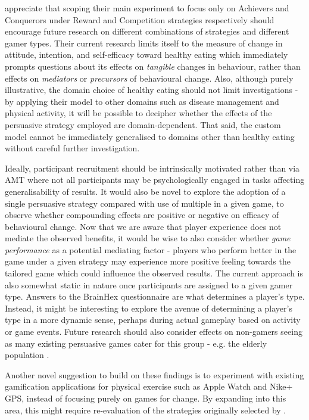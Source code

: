\documentclass[11pt]{article}
\begin{document}
\citeauthor{orji2017} appreciate that scoping their main experiment to focus only on Achievers and Conquerors under Reward and Competition strategies respectively should encourage future research on different combinations of strategies and different gamer types. Their current research limits itself to the measure of change in attitude, intention, and self-efficacy toward healthy eating which immediately prompts questions about its effects on \textit{tangible} changes in behaviour, rather than effects on \textit{mediators} or \textit{precursors} of behavioural change. Also, although purely illustrative, the domain choice of healthy eating should not limit investigations - by applying their model to other domains such as disease management and physical activity, it will be possible to decipher whether the effects of the persuasive strategy employed are domain-dependent. That said, the custom model cannot be immediately generalised to domains other than healthy eating without careful further investigation.

Ideally, participant recruitment should be intrinsically motivated rather than via AMT where not all participants may be psychologically engaged in tasks affecting generalisability of results. It would also be novel to explore the adoption of a single persuasive strategy compared with use of multiple in a given game, to observe whether compounding effects are positive or negative on efficacy of behavioural change. Now that we are aware that player experience does not mediate the observed benefits, it would be wise to also consider whether \textit{game performance} as a potential mediating factor - players who perform better in the game under a given strategy may experience more positive feeling towards the tailored game which could influence the observed results. The current approach is also somewhat static in nature once participants are assigned to a given gamer type. Answers to the BrainHex questionnaire are what determines a player's type. Instead, it might be interesting to explore the avenue of determining a player's type in a more dynamic sense, perhaps during actual gameplay based on activity or game events. Future research should also consider effects on non-gamers seeing as many existing persuasive games cater for this group - e.g. the elderly population \citep{deoliveira2010}.

Another novel suggestion to build on these findings is to experiment with existing gamification applications for physical exercise such as Apple Watch and Nike+ GPS, instead of focusing purely on games for change. By expanding into this area, this might require re-evaluation of the strategies originally selected by \citet{gerling2014}.
\end{document}
